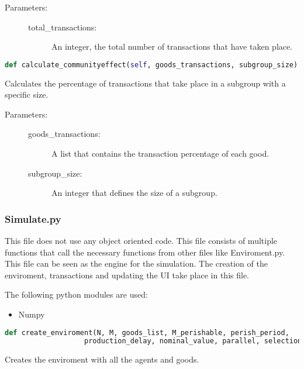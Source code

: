 \documentclass{article}
\begin{document}
\begin{description}
  \item[Parameters:] \hfill
	\begin{description}
  		\item[total\_transactions:] An integer, the total number of transactions that have taken place.
	\end{description}
\end{description}

\begin{lstlisting}[language=Python]
def calculate_communityeffect(self, goods_transactions, subgroup_size):
\end{lstlisting}
Calculates the percentage of transactions that take place in a subgroup with a specific size.

\begin{description}
  \item[Parameters:] \hfill
	\begin{description}
  		\item[goods\_transactions:] A list that contains the transaction percentage of each good.
		\item[subgroup\_size:] An integer that defines the size of a subgroup.
	\end{description}
\end{description}

\subsubsection{Simulate.py}
This file does  not use any object oriented code. This file consists of multiple functions that call the necessary functions from other files like Enviroment.py. This file can be seen as the engine for the simulation. The creation of the enviroment, transactions and updating the UI take place in this file.

The following python modules are used:
\begin{itemize}
  \item Numpy
\end{itemize}


\begin{lstlisting}[language=Python]
def create_enviroment(N, M, goods_list, M_perishable, perish_period,
			       production_delay, nominal_value, parallel, selectionrule):
\end{lstlisting}
Creates the enviroment with all the agents and goods.
\end{document}
